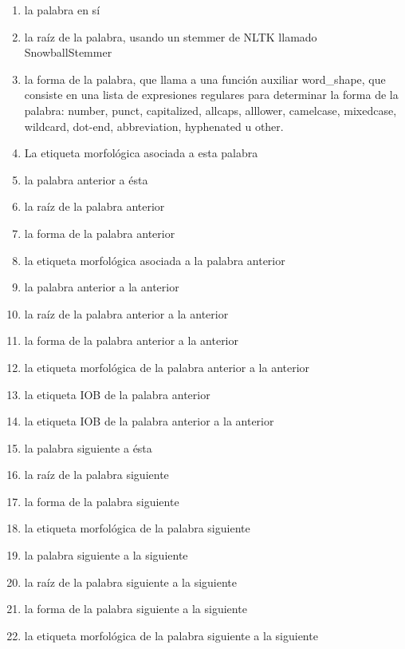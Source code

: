 \documentclass{pre-tfg}
\begin{document}
\begin{enumerate}
	\item la palabra en sí
	\item la raíz de la palabra, usando un stemmer de NLTK llamado SnowballStemmer
	\item la forma de la palabra, que llama a una función auxiliar word\_shape, que consiste en una lista de expresiones regulares para determinar la forma de la palabra: number, punct, capitalized, allcaps, alllower, camelcase, mixedcase, wildcard, dot-end, abbreviation, hyphenated u other.
	\item La etiqueta morfológica asociada a esta palabra
	\item la palabra anterior a ésta
	\item la raíz de la palabra anterior
	\item la forma de la palabra anterior
	\item la etiqueta morfológica asociada a la palabra anterior
	\item la palabra anterior a la anterior
	\item la raíz de la palabra anterior a la anterior
	\item la forma de la palabra anterior a la anterior
	\item la etiqueta morfológica de la palabra anterior a la anterior
	\item la etiqueta IOB de la palabra anterior
	\item la etiqueta IOB de la palabra anterior a la anterior
	\item la palabra siguiente a ésta
	\item la raíz de la palabra siguiente
	\item la forma de la palabra siguiente
	\item la etiqueta morfológica de la palabra siguiente
	\item la palabra siguiente a la siguiente
	\item la raíz de la palabra siguiente a la siguiente
	\item la forma de la palabra siguiente a la siguiente
	\item la etiqueta morfológica de la palabra siguiente a la siguiente
\end{enumerate}
\end{document}
